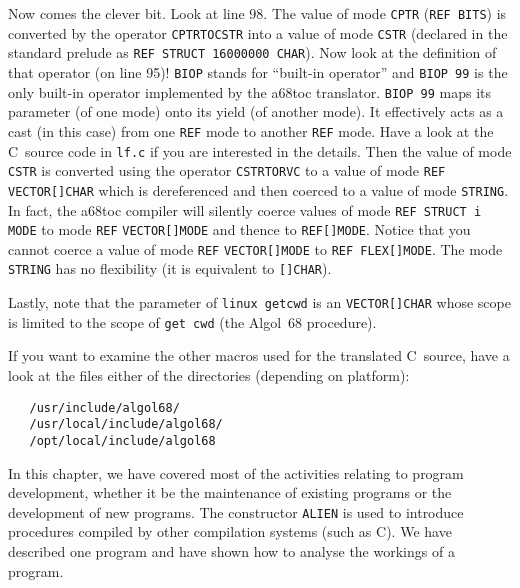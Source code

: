 Now comes the clever bit. Look at line 98. The value of mode
\verb|CPTR| (\verb|REF BITS|) is converted by the operator
\verb|CPTRTOCSTR| into a value of mode \verb|CSTR| (declared in the
standard prelude as \verb|REF STRUCT 16000000 CHAR|). Now look at the
definition of that operator (on line 95)! \verb|BIOP| stands for
``built-in operator'' and \verb|BIOP 99| is the only built-in
operator implemented by the a68toc translator. \verb|BIOP 99| maps
its parameter (of one mode) onto its yield (of another mode). It
effectively acts as a cast (in this case) from one \verb|REF| mode to
another \verb|REF| mode. Have a look at the C~source code in
\verb|lf.c| if you are interested in the details. Then the value of
mode \verb|CSTR| is converted using the operator \verb|CSTRTORVC| to
a value of mode \verb|REF VECTOR[]CHAR| which is dereferenced and
then coerced to a value of mode \verb|STRING|. In fact, the a68toc
compiler will silently coerce values of mode \verb|REF STRUCT i MODE|
to mode \verb|REF| \verb|VECTOR[]MODE| and thence to
\verb|REF[]MODE|.  Notice that you cannot coerce a value of mode
\verb|REF| \verb|VECTOR[]MODE| to \verb|REF FLEX[]MODE|. The mode
\verb|STRING| has no flexibility (it is equivalent to \verb|[]CHAR|).

Lastly, note that the parameter of \verb|linux getcwd| is an
 \verb|VECTOR[]CHAR| whose scope
is limited to the scope of \verb|get cwd| (the Algol~68 procedure).

If you want to examine the other macros used for the translated
C~source, have a look at the files either of the directories (depending on platform):
\begin{verbatim}
   /usr/include/algol68/
   /usr/local/include/algol68/
   /opt/local/include/algol68
\end{verbatim}

In this chapter, we have covered most of the activities relating to
program development, whether it be the maintenance of existing
programs or the development of new programs. The constructor
\verb|ALIEN| is used to introduce procedures compiled by other
compilation systems (such as C). We have described one program
and have shown how to analyse the workings of a program.
